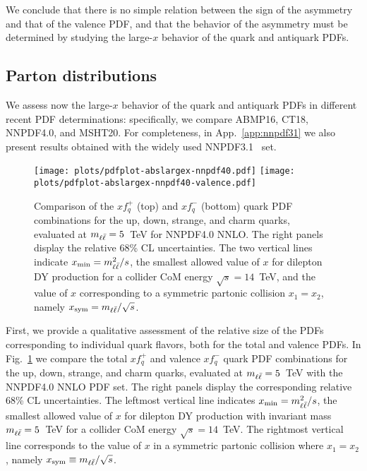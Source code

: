 We conclude that there
is no simple relation between the sign of the asymmetry and that of
the valence PDF, and that the
behavior of the asymmetry must be determined by studying the large-$x$
behavior of the quark and antiquark PDFs.

\subsection{Parton distributions}
\label{sec:subsec-largexPDFs}

We assess now the large-$x$ behavior of
the quark and antiquark PDFs in different recent PDF
determinations: specifically, we compare
 ABMP16,
 CT18,  NNPDF4.0,
 and MSHT20.
%
 For
completeness, in App.~\ref{app:nnpdf31} we also present results
obtained with the widely used NNPDF3.1~\cite{Ball:2017nwa} set.

\begin{figure}[!t]
 \centering
 \texttt{[image: plots/pdfplot-abslargex-nnpdf40.pdf]}
 \texttt{[image: plots/pdfplot-abslargex-nnpdf40-valence.pdf]}
 \caption{\small Comparison of the $xf^+_q$ (top) and $xf_q^-$ (bottom) quark
   PDF combinations for the up, down, strange, and charm quarks,
   evaluated at $m_{\ell\bar{\ell}}=5$~TeV for NNPDF4.0 NNLO.
   The right panels display the relative 68\% CL uncertainties.
   The two vertical lines indicate $x_{\rm min}=m_{\ell\bar{\ell}}^2/s$, the
   smallest allowed value of $x$ 
   for dilepton DY production for a collider
   CoM energy $\sqrt{s}=14$~TeV, and the value of $x$
   corresponding to a symmetric partonic collision $x_1=x_2$, namely
 $x_{\rm  sym}=m_{\ell\bar{\ell}}/\sqrt{s}$.
 }    
 \label{fig:pdfplot-abslargex}
\end{figure}

First, we provide a qualitative assessment of the relative size of the
PDFs corresponding to
individual quark flavors, both for the total and valence PDFs.
In Fig.~\ref{fig:pdfplot-abslargex} we
compare  the total $xf^+_q$ and valence $xf_q^-$  quark
   PDF combinations for the up, down, strange, and charm quarks,
   evaluated at $m_{\ell\bar{\ell}}=5$~TeV with the NNPDF4.0 NNLO PDF set.
   The right panels display the corresponding relative 68\% CL uncertainties.
  The leftmost vertical line indicates $x_{\rm min}=m_{\ell\bar{\ell}}^2/s$, the
  smallest allowed value of $x$ 
   for dilepton DY production with invariant mass $m_{\ell\bar{\ell}}=5$~TeV for a collider
   CoM energy $\sqrt{s}=14$~TeV.
   The rightmost vertical line corresponds to
   the value of $x$ in a symmetric partonic collision where $x_1=x_2$, namely
   $x_{\rm  sym}\equiv m_{\ell\bar{\ell}}/\sqrt{s}$.

